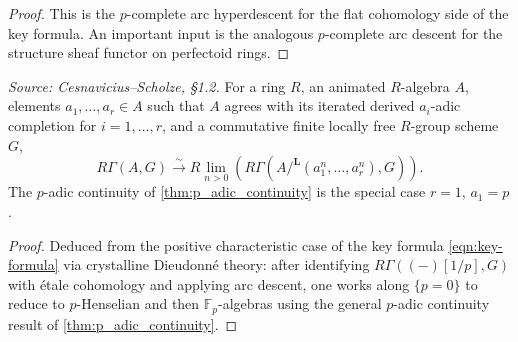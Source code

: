 \begin{proof}
  \uses{}
  This is the \(p\)-complete arc hyperdescent for the flat cohomology side of the key formula. An important input is the analogous \(p\)-complete arc descent for the structure sheaf functor on perfectoid rings.
\end{proof}

\begin{theorem}
  \label{thm:adic_continuity}
  \textit{Source: Cesnavicius--Scholze, §1.2.}
  For a ring \(R\), an animated \(R\)-algebra \(A\), elements \(a_1, \ldots, a_r \in A\) such that \(A\) agrees with its iterated derived \(a_i\)-adic completion for \(i = 1, \ldots, r\), and a commutative finite locally free \(R\)-group scheme \(G\),
  \[
    R\Gamma(A, G) \xrightarrow{\sim} R\lim_{n > 0} \left( R\Gamma(A/^{\mathbf{L}} (a_1^n, \ldots, a_r^n), G) \right).
  \]
  The \(p\)-adic continuity of \cref{thm:p_adic_continuity} is the special case \(r = 1\), \(a_1 = p\).
\end{theorem}

\begin{proof}
  Deduced from the positive characteristic case of the key formula \eqref{eqn:key-formula} via crystalline Dieudonné theory: after identifying \(R\Gamma((-)[1/p], G)\) with étale cohomology and applying arc descent, one works along \(\{p = 0\}\) to reduce to \(p\)-Henselian and then \(\mathbb{F}_p\)-algebras using the general \(p\)-adic continuity result of \cref{thm:p_adic_continuity}.
\end{proof}

